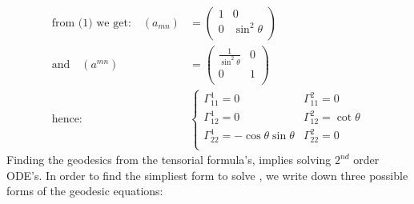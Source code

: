 \begin{align}
\text{from (1) we get:}\quad (a_{mn}) &= \begin{pmatrix}
 1&  0\\
0 & \sin^2\theta \\
\end{pmatrix}\\
\text{and}\quad (a^{mn}) &= \begin{pmatrix}
 \frac{1}{\sin^2\theta}&  0\\
0 & 1 \\
\end{pmatrix}\\
\text{hence:}\quad & \left \{ \begin{array}{ll}
\Gamma^1_{11}  = 0&\Gamma^2_{11}  = 0\\
\Gamma^1_{12}  = 0&\Gamma^2_{12}  = \cot\theta\\
\Gamma^1_{22}  = -\cos\theta\sin\theta&\Gamma^2_{22}  = 0\\
\end{array}\right.
\end{align}
Finding the geodesics from the tensorial formula's, implies solving $2^{nd}$ order ODE's. In order to find the simpliest form to solve , we write down three possible forms of the geodesic equations:
